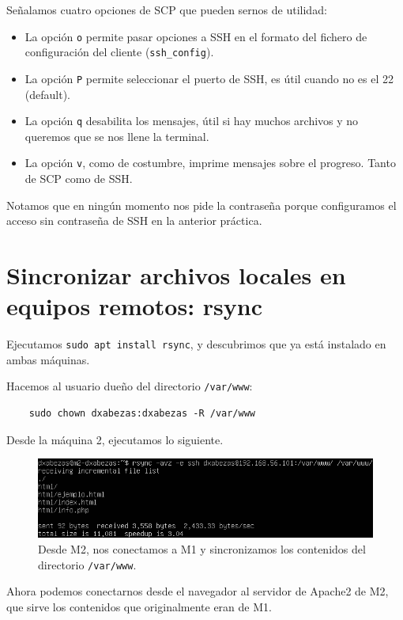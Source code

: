 \documentclass{article}
\begin{document}
Señalamos cuatro opciones de SCP que pueden sernos de utilidad:
\begin{itemize}
	\item La opción \texttt{o} permite pasar opciones a SSH en el formato del fichero de configuración del cliente
	 (\texttt{ssh\_config}).
	\item La opción \texttt{P} permite seleccionar el puerto de SSH, es útil cuando no es el 22 (default).
	\item La opción \texttt{q} desabilita los mensajes, útil si hay muchos archivos y no queremos que se nos llene la terminal.
	\item La opción \texttt{v}, como de costumbre, imprime mensajes sobre el progreso. Tanto de SCP como de SSH.
\end{itemize}

Notamos que en ningún momento nos pide la contraseña porque configuramos el acceso sin contraseña de SSH en la anterior práctica.

\section{Sincronizar archivos locales en equipos remotos: rsync}

Ejecutamos \texttt{sudo apt install rsync}, y descubrimos que ya está instalado en ambas máquinas.

Hacemos al usuario dueño del directorio \texttt{/var/www}:

\begin{verbatim}
	sudo chown dxabezas:dxabezas -R /var/www
\end{verbatim}

Desde la máquina 2, ejecutamos lo siguiente.

\begin{figure}[H]
	\centering
	\includegraphics[width=150mm]{imgs/rsync}
	\caption{Desde M2, nos conectamos a M1 y sincronizamos los contenidos del directorio \texttt{/var/www}.}
	\label{fig:rsync}
\end{figure}

Ahora podemos conectarnos desde el navegador al servidor de Apache2 de M2, que sirve los contenidos que originalmente eran de 
M1.
\end{document}
